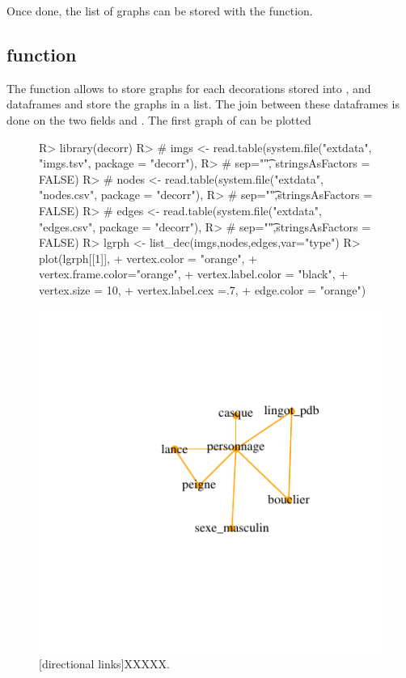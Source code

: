 \documentclass[article]{jss}
\begin{document}
Once done, the list of graphs can be stored with the  function.

\subsection{ function} \label{sec:funlistdec}

The  function allows to store graphs for each decorations stored into ,  and  dataframes and store the graphs in a list. The join between these dataframes is done on the two fields  and . The first graph of can be plotted


\begin{figure}[H]
\begin{Schunk}
\begin{Sinput}
R> library(decorr)
R> # imgs <- read.table(system.file("extdata", "imgs.tsv", package = "decorr"),
R> #                       sep="\t", stringsAsFactors = FALSE)
R> # nodes <- read.table(system.file("extdata", "nodes.csv", package = "decorr"),
R> #                     sep="\t",stringsAsFactors = FALSE)
R> # edges <- read.table(system.file("extdata", "edges.csv", package = "decorr"),
R> #                     sep="\t",stringsAsFactors = FALSE)
R> lgrph <- list_dec(imgs,nodes,edges,var="type")
R> plot(lgrph[[1]],
+       vertex.color = "orange",
+       vertex.frame.color="orange",
+       vertex.label.color = "black",
+       vertex.size = 10,
+       vertex.label.cex =.7,
+       edge.color = "orange")
\end{Sinput}
\end{Schunk}
\includegraphics{article_rvTH13-plotg}
[directional links]{XXXXX.}
\end{figure}
\end{document}
